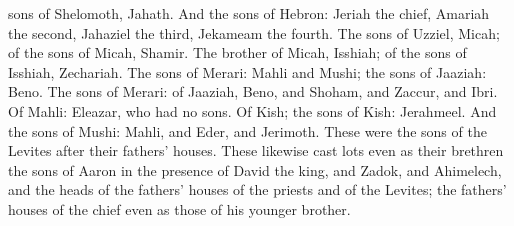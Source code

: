 sons of Shelomoth, Jahath. And the sons of Hebron: Jeriah the chief, Amariah the second, Jahaziel the third, Jekameam the fourth. The sons of Uzziel, Micah; of the sons of Micah, Shamir. The brother of Micah, Isshiah; of the sons of Isshiah, Zechariah. The sons of Merari: Mahli and Mushi; the sons of Jaaziah: Beno. The sons of Merari: of Jaaziah, Beno, and Shoham, and Zaccur, and Ibri. Of Mahli: Eleazar, who had no sons. Of Kish; the sons of Kish: Jerahmeel. And the sons of Mushi: Mahli, and Eder, and Jerimoth. These were the sons of the Levites after their fathers’ houses. These likewise cast lots even as their brethren the sons of Aaron in the presence of David the king, and Zadok, and Ahimelech, and the heads of the fathers’ houses of the priests and of the Levites; the fathers’ houses of the chief even as those of his younger brother. 

